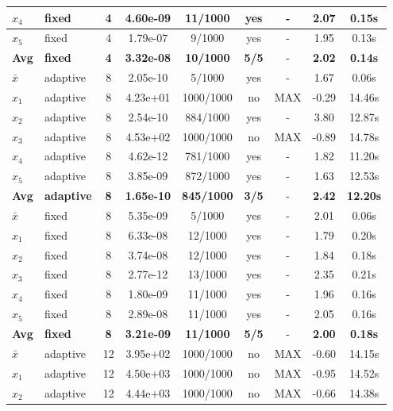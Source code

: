 \begin{longtable}{|l|l|c|c|c|c|c|c|c|}
\hline
$x_4$ & fixed & 4 & 4.60e-09 & 11/1000 & yes & - & 2.07 & 0.15s \\
\hline
$x_5$ & fixed & 4 & 1.79e-07 & 9/1000 & yes & - & 1.95 & 0.13s \\
\hline
\hline\hline
\textbf{Avg} & \textbf{fixed} & \textbf{4} & \textbf{3.32e-08} & \textbf{10/1000} & \textbf{5/5} & - & \textbf{2.02} & \textbf{0.14s} \\
\hline\hline
$\bar{x}$ & adaptive & 8 & 2.05e-10 & 5/1000 & yes & - & 1.67 & 0.06s \\
\hline
$x_1$ & adaptive & 8 & 4.23e+01 & 1000/1000 & no & MAX & -0.29 & 14.46s \\
\hline
$x_2$ & adaptive & 8 & 2.54e-10 & 884/1000 & yes & - & 3.80 & 12.87s \\
\hline
$x_3$ & adaptive & 8 & 4.53e+02 & 1000/1000 & no & MAX & -0.89 & 14.78s \\
\hline
$x_4$ & adaptive & 8 & 4.62e-12 & 781/1000 & yes & - & 1.82 & 11.20s \\
\hline
$x_5$ & adaptive & 8 & 3.85e-09 & 872/1000 & yes & - & 1.63 & 12.53s \\
\hline
\hline\hline
\textbf{Avg} & \textbf{adaptive} & \textbf{8} & \textbf{1.65e-10} & \textbf{845/1000} & \textbf{3/5} & - & \textbf{2.42} & \textbf{12.20s} \\
\hline\hline
\hline
$\bar{x}$ & fixed & 8 & 5.35e-09 & 5/1000 & yes & - & 2.01 & 0.06s \\
\hline
$x_1$ & fixed & 8 & 6.33e-08 & 12/1000 & yes & - & 1.79 & 0.20s \\
\hline
$x_2$ & fixed & 8 & 3.74e-08 & 12/1000 & yes & - & 1.84 & 0.18s \\
\hline
$x_3$ & fixed & 8 & 2.77e-12 & 13/1000 & yes & - & 2.35 & 0.21s \\
\hline
$x_4$ & fixed & 8 & 1.80e-09 & 11/1000 & yes & - & 1.96 & 0.16s \\
\hline
$x_5$ & fixed & 8 & 2.89e-08 & 11/1000 & yes & - & 2.05 & 0.16s \\
\hline
\hline\hline
\textbf{Avg} & \textbf{fixed} & \textbf{8} & \textbf{3.21e-09} & \textbf{11/1000} & \textbf{5/5} & - & \textbf{2.00} & \textbf{0.18s} \\
\hline\hline
$\bar{x}$ & adaptive & 12 & 3.95e+02 & 1000/1000 & no & MAX & -0.60 & 14.15s \\
\hline
$x_1$ & adaptive & 12 & 4.50e+03 & 1000/1000 & no & MAX & -0.95 & 14.52s \\
\hline
$x_2$ & adaptive & 12 & 4.44e+03 & 1000/1000 & no & MAX & -0.66 & 14.38s \\

\end{longtable}
